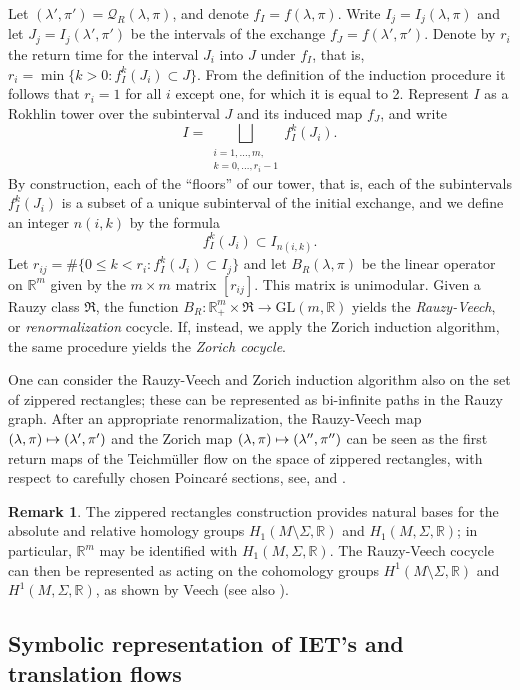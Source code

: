 \documentclass[JEP,XML,SOM,Unicode]{cedram}
\let\mathcal\mathscr
\def\mto{\mathchoice{\longmapsto}{\mapsto}{\mapsto}{\mapsto}}
\newcommand{\GL}{\mathrm{GL}}
\theoremstyle{plain}
\theoremstyle{definition}
\newtheorem*{rem*}{Remark}
\let\lam\lambda
\let\Sig\Sigma
\newcommand\FrR{\mathfrak{R}}
\newcommand\Qk{\mathcal{Q}}
\newcommand{\R}{\mathbb{R}}
\newcommand\be{\begin{equation}}
\newcommand\ee{\end{equation}}
\begin{document}
Let $(\lam',\pi')=\Qk_R(\lam,\pi)$, and denote $f_I=f(\lam,\pi)$. Write $I_j = I_j(\lam,\pi)$ and let $J_j = I_j(\lam',\pi')$ be the intervals of the exchange $f_J=f(\lam',\pi')$. Denote by
$r_i$ the return time for the interval $J_i$ into $J$ under $f_I$, that is,
$r_i = \min\{k>0: f_I^k (J_i) \subset J\}$. From the definition of the induction procedure it follows that $r_i = 1$ for all $i$ except one, for which it is equal to 2.
Represent $I$ as a Rokhlin tower over the subinterval $J$ and its induced map $f_J$, and write
\be \label{Rokhlin1}
I = \bigsqcup_{\substack{i=1,\ldots,m,\\ k = 0, \ldots, r_i-1}} f_I^k (J_i).
\ee
By construction, each of the ``floors'' of our tower, that is, each of the subintervals $f_I^k (J_i)$ is a subset of a unique subinterval of the initial exchange, and we define an integer $n(i,k)$ by the formula
\be \label{Rokhlin2}
f_I^k (J_i) \subset I_{n(i,k)}.
\ee
{ Let $r_{ij} = \#\{0 \le k < r_i: f_I^k(J_i) \subset I_j\}$ and let
$B_R(\lam,\pi)$ be the linear operator on $\R^m$ given by the $m\times m$ matrix $[r_{ij}]$. } This matrix is unimodular. Given a Rauzy class $\FrR$, the function $B_R: \R^m_+\times \FrR \to \GL(m,\R)$ yields the \emph{Rauzy-Veech}, or \emph{renormalization} cocycle. If, instead, we apply the Zorich induction algorithm, the same procedure yields the \emph{Zorich cocycle}.

One can consider the Rauzy-Veech and Zorich induction algorithm also on the set of zippered rectangles; these can be represented as bi-infinite paths in the Rauzy graph. After an appropriate renormalization, the Rauzy-Veech map $(\lam,\pi)\mto (\lam',\pi')$ and the Zorich map $(\lam,\pi) \mto (\lam'',\pi'')$ can be seen as the first return maps of the Teichmüller flow on the space of zippered rectangles, with respect to carefully chosen Poincaré sections, see, \eg \cite[\S2.10]{viana2} and \cite[\S11.3]{yoccoz}.

\begin{rem*}
The zippered rectangles construction provides natural bases for the absolute and relative homology groups $H_1(M\setminus \Sig,\R)$ and $H_1(M,\Sig,\R)$; in particular, $\R^m$ may be identified with $H_1(M,\Sig,\R)$. The Rauzy-Veech cocycle can then be represented as acting on the cohomology groups
$H^1(M\setminus \Sig,\R)$ and $H^1(M,\Sig,\R)$, as shown by Veech \cite{veech} (see also \cite[\S2.9]{viana2}).
\end{rem*}


\subsection{Symbolic representation of IET's and translation flows} \label{subsec-symbol}
\end{document}
